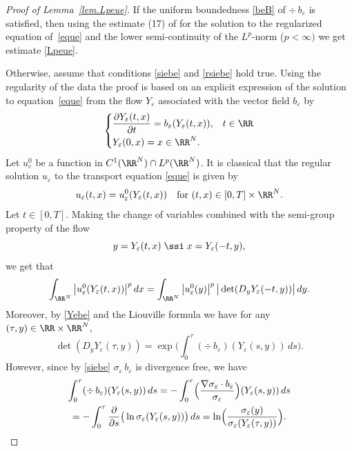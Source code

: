 \begin{proof}[Proof of Lemma~\ref{lem.Lpeue}]
If the uniform boundedness \eqref{beB} of $\div\,b_\varepsilon$ is satisfied, then using the estimate (17) of \cite[Prop.\,II.1]{DiLi} for the solution to the regularized equation of~\eqref{eque} and the lower semi-continuity of the $L^p$-norm ($p<\infty)$ we get estimate \eqref{Lpeue}.

Otherwise, assume that conditions \eqref{siebe} and \eqref{rsiebe} hold true.
Using the regularity of the data the proof is based on an explicit expression of the solution to equation~\eqref{eque} from the flow $Y_\varepsilon$ associated with the vector field $b_\varepsilon$ by
\begin{equation}\label{Yebe}
\begin{cases}
\dfrac{\partial Y_\varepsilon(t,x)}{\partial t}=b_\varepsilon(Y_\varepsilon(t,x)), & t\in\RR
\\[5pt]
Y_\varepsilon(0,x)=x\in\RR^N.
\end{cases}
\end{equation}
Let $u_\varepsilon^0$ be a function in $C^1(\RR^N)\cap L^p(\RR^N)$.
It is classical that the regular solution $u_\varepsilon$ to the transport equation \eqref{eque} is given by
\begin{equation}\label{ueXe}
u_\varepsilon(t,x)=u_\varepsilon^0(Y_\varepsilon(t,x))\quad\mbox{for }(t,x)\in[0,T]\times\RR^N.
\end{equation}
Let $t\in[0,T]$. Making the change of variables combined with the semi-group property of the flow
\[
y=Y_\varepsilon(t,x)\;\ssi\;x=Y_\varepsilon(-t,y),
\]
we get that
\begin{equation}\label{Lpeue01}
\int_{\RR^N}\big|u_\varepsilon^0(Y_\varepsilon(t,x))\big|^p\,dx=\int_{\RR^N}\big|u_\varepsilon^0(y)\big|^p\,\big|\det(D_y Y_\varepsilon(-t,y))\big|\,dy.
\end{equation}
Moreover, by \eqref{Yebe} and the Liouville formula we have for any $(\tau,y)\in\RR\times\RR^N$,
\[
\det(D_y Y_\varepsilon(\tau,y))=\exp\biggl(\int_0^{\tau}(\div\,b_\varepsilon)(Y_\varepsilon(s,y))\,ds\biggr).
\]
However, since by \eqref{siebe} $\sigma_\varepsilon\,b_\varepsilon$ is divergence free, we have
\begin{multline*}
 \int_0^{\tau}(\div\,b_\varepsilon)(Y_\varepsilon(s,y))\,ds=-\int_0^{\tau}\Bigl(\dfrac{\nabla\sigma_\varepsilon\cdot b_\varepsilon}{\sigma_\varepsilon}\Bigr)(Y_\varepsilon(s,y))\,ds
\\
=-\int_0^{\tau} \dfrac{\partial}{\partial s}\big(\ln \sigma_\varepsilon(Y_\varepsilon(s,y))\big)\,ds=\ln\Bigl(\dfrac{\sigma_\varepsilon(y)}{\sigma_\varepsilon(Y_\varepsilon(\tau,y))}\Bigr).

\end{multline*}
\end{proof}
